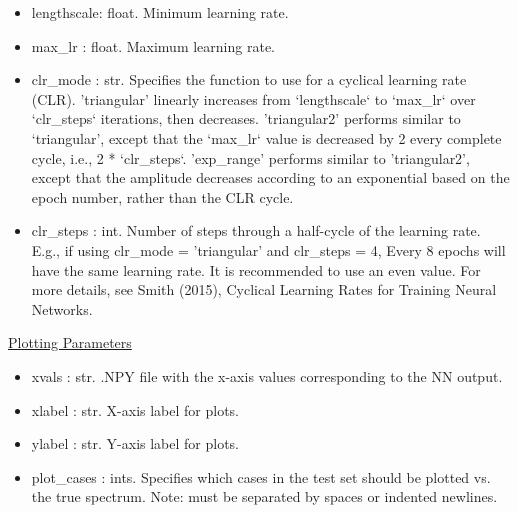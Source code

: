 \documentclass[letterpaper, 12pt]{article}
\begin{document}
\begin{itemize}
\item lengthscale: float. Minimum learning rate.
\item max\_lr     : float. Maximum learning rate.
\item clr\_mode   : str.   Specifies the function to use for a cyclical learning rate 
                    (CLR).
                    'triangular' linearly increases from `lengthscale` to 
                    `max\_lr` over `clr\_steps` iterations, then decreases.
                    'triangular2' performs similar to `triangular', except that 
                    the `max\_lr` value is decreased by 2 every complete cycle,
                    i.e., 2 * `clr\_steps`.
                    'exp\_range' performs similar to 'triangular2', except that 
                    the amplitude decreases according to an exponential based 
                    on the epoch number, rather than the CLR cycle.
\item clr\_steps  : int.   Number of steps through a half-cycle of the learning rate.
                    E.g., if using clr\_mode = 'triangular' and clr\_steps = 4, 
                    Every 8 epochs will have the same learning rate.
                    It is recommended to use an even value.
                    For more details, see Smith (2015), Cyclical Learning Rates 
                    for Training Neural Networks.
\end{itemize}

\noindent \underline{Plotting Parameters}
\begin{itemize}
\item xvals       : str.  .NPY file with the x-axis values corresponding to 
                          the NN output.
\item xlabel      : str.  X-axis label for plots.
\item ylabel      : str.  Y-axis label for plots.
\item plot\_cases : ints. Specifies which cases in the test set should be 
                   plotted vs. the true spectrum.
                   Note: must be separated by spaces or indented newlines.
\end{itemize}
\end{document}
